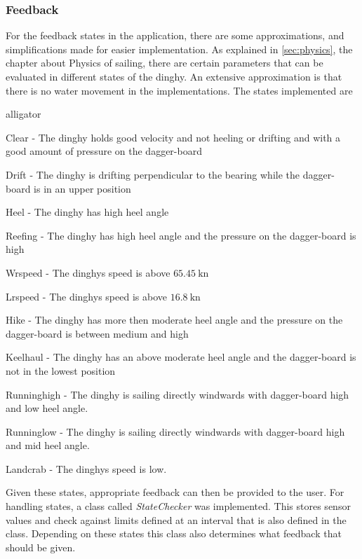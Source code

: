 \subsubsection{Feedback}
For the feedback states in the application, there are some approximations, and simplifications made for easier implementation. As explained in \autoref{sec:physics}, the chapter about Physics of sailing, there are certain parameters that can be evaluated in different states of the dinghy. An extensive approximation is that there is no water movement in the implementations. The states implemented are
\begin{labeling}{alligator}
\item [Clear] - The dinghy holds good velocity and not heeling or drifting and with a good amount of pressure on the dagger-board
\item [Drift] - The dinghy is drifting perpendicular to the bearing while the dagger-board is in an upper position
\item [Heel] - The dinghy has high heel angle
\item [Reefing] - The dinghy has high heel angle and the pressure on the dagger-board is high
\item [Wrspeed] - The dinghys speed is above $65.45~\textrm{kn}$
\item [Lrspeed] - The dinghys speed is above $16.8~\textrm{kn}$
\item [Hike] - The dinghy has more then moderate heel angle and the pressure on the dagger-board is between medium and high
\item [Keelhaul] - The dinghy has an above moderate heel angle and the dagger-board is not in the lowest position
\item [Runninghigh] - The dinghy is sailing directly windwards with dagger-board high and low heel angle.
\item [Runninglow] - The dinghy is sailing directly windwards with dagger-board high and mid heel angle.
\item [Landcrab] - The dinghys speed is low.
\end{labeling}
Given these states, appropriate feedback can then be provided to the user. For handling states, a class called \emph{StateChecker} was implemented. This stores sensor values and check against limits defined at an interval that is also defined in the class. Depending on these states this class also determines what feedback that should be given.

